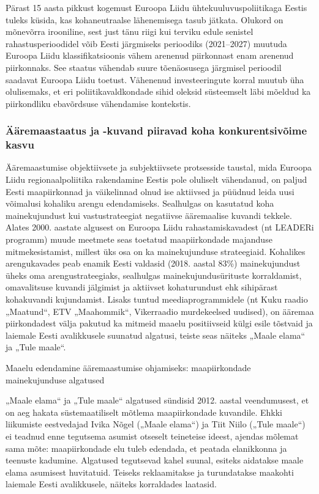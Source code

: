 \documentclass[estonian,]{article}
\begin{document}
Pärast 15 aasta pikkust kogemust Euroopa Liidu ühtekuuluvuspoliitikaga Eestis tuleks küsida, kas kohaneutraalse lähenemisega tasub jätkata. Olukord on mõnevõrra irooniline, sest just tänu riigi kui terviku edule senistel rahastusperioodidel võib Eesti järgmiseks perioodiks (2021--2027) muutuda Euroopa Liidu klassifikatsioonis vähem arenenud piirkonnast enam arenenud piirkonnaks. See staatus vähendab suure tõenäosusega järgmisel perioodil saadavat Euroopa Liidu toetust. Vähenenud investeeringute korral muutub üha olulisemaks, et eri poliitikavaldkondade sihid oleksid süsteemselt läbi mõeldud ka piirkondliku ebavõrdsuse vähendamise kontekstis.

\hypertarget{uxe4uxe4remaastaatus-ja--kuvand-piiravad-koha-konkurentsivuxf5ime-kasvu}{%
\subsubsection*{Ääremaastaatus ja -kuvand piiravad koha konkurentsivõime kasvu}\label{uxe4uxe4remaastaatus-ja--kuvand-piiravad-koha-konkurentsivuxf5ime-kasvu}}

Ääremaastumise objektiivsete ja subjektiivsete protsesside taustal, mida Euroopa Liidu regionaalpoliitika rakendamine Eestis pole oluliselt vähendanud, on paljud Eesti maapiirkonnad ja väikelinnad olnud ise aktiivsed ja püüdnud leida uusi võimalusi kohaliku arengu edendamiseks. Sealhulgas on kasutatud koha mainekujundust kui vastustrateegiat negatiivse ääremaalise kuvandi tekkele. Alates 2000. aastate algusest on Euroopa Liidu rahastamiskavadest (nt LEADERi programm) muude meetmete seas toetatud maapiirkondade majanduse mitmekesistamist, millest üks osa on ka mainekujunduse strateegiaid. Kohalikes arengukavades peab enamik Eesti valdasid (2018. aastal 83\%) mainekujundust üheks oma arengustrateegiaks, sealhulgas mainekujundusürituste korraldamist, omavalitsuse kuvandi jälgimist ja aktiivset kohaturundust ehk sihipärast kohakuvandi kujundamist. Lisaks tuntud meediaprogrammidele (nt Kuku raadio „Maatund``, ETV „Maahommik``, Vikerraadio murdekeelsed uudised), on ääremaa piirkondadest välja pakutud ka mitmeid maaelu positiivseid külgi esile tõstvaid ja laiemale Eesti avalikkusele suunatud algatusi, teiste seas näiteks „Maale elama`` ja „Tule maale``.

Maaelu edendamine ääremaastumise ohjamiseks: maapiirkondade mainekujunduse algatused

„Maale elama`` ja „Tule maale`` algatused sündisid 2012. aastal veendumusest, et on aeg hakata süstemaatiliselt mõtlema maapiirkondade kuvandile. Ehkki liikumiste eestvedajad Ivika Nõgel („Maale elama``) ja Tiit Niilo („Tule maale``) ei teadnud enne tegutsema asumist otseselt teineteise ideest, ajendas mõlemat sama mõte: maapiirkondade elu tuleb edendada, et peatada elanikkonna ja teenuste kadumine. Algatused tegutsevad kahel suunal, esiteks aidatakse maale elama asumisest huvitatuid. Teiseks reklaamitakse ja turundatakse maakohti laiemale Eesti avalikkusele, näiteks korraldades laatasid.
\end{document}
